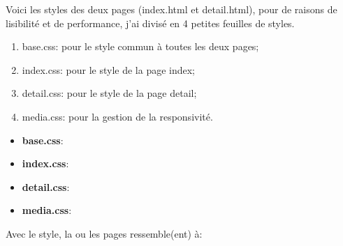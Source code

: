 \documentclass[a4paper,11pt]{article}
\begin{document}
        \bigskip
        \noindent Voici les styles des deux pages (index.html et detail.html),
        pour de raisons de lisibilité et de performance, j'ai divisé en 4 petites 
        feuilles de styles.
        \begin{enumerate}
            \item base.css: pour le style commun à toutes les deux pages;
            \item index.css: pour le style de la page index;
            \item detail.css: pour le style de la page detail;
            \item media.css: pour la gestion de la responsivité.
        \end{enumerate}

        \begin{itemize}
            \item \textbf{base.css}:
                
            \item \textbf{index.css}:
                
            \item \textbf{detail.css}:
                
            \item \textbf{media.css}: 
                
        \end{itemize}
        
        \noindent Avec le style, la ou les pages ressemble(ent) à: 
        
\end{document}
